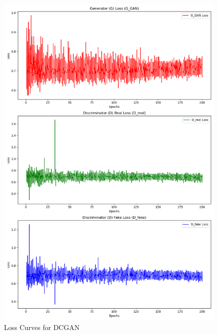 \documentclass{article}
\begin{document}
\begin{figure}[htbp]
    \centering
    \begin{minipage}{0.45\textwidth}
        \centering
        \includegraphics[width=\linewidth]{dcgan_loss_curves_subplot.png}
        \caption{Loss Curves for DCGAN}
        \label{fig:dcgan_loss}
    \end{minipage} \hfill
    \begin{minipage}{0.45\textwidth}
        \centering

\end{minipage}
\end{figure}
\end{document}
